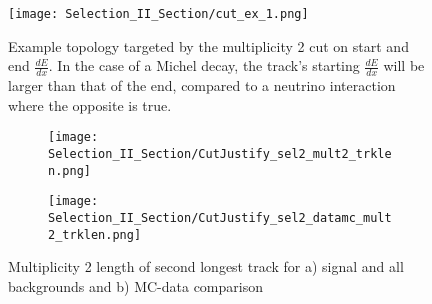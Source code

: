 \begin{figure}[H]
  \centering
  \texttt{[image: Selection\_II\_Section/cut\_ex\_1.png]}
  \caption{Example topology targeted by the multiplicity 2 cut on start and end $\frac{dE}{dx}$.  In the case of a Michel decay, the track's starting $\frac{dE}{dx}$ will be larger than that of the end, compared to a neutrino interaction where the opposite is true. }
\label{fig:cut_ex_1}
\end{figure}

\begin{figure}[H]
  \begin{subfigure}[t]{0.4\textwidth}
    \texttt{[image: Selection\_II\_Section/CutJustify\_sel2\_mult2\_trklen.png]}
    \caption{ }
  \end{subfigure} 
  \hspace{15mm}
  \begin{subfigure}[t]{0.4\textwidth}
    \texttt{[image: Selection\_II\_Section/CutJustify\_sel2\_datamc\_mult2\_trklen.png]}
    \caption{ }
  \end{subfigure} 

\caption{Multiplicity 2 length of second longest track for a) signal and all backgrounds and b) MC-data comparison }
\label{fig:cutjust_sel2_mult2_secondtrklen}
\end{figure}

